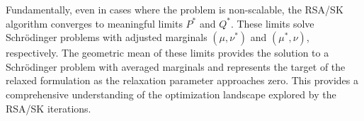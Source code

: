\documentclass{article}
\begin{document}
Fundamentally, even in cases where the problem is non-scalable, the RSA/SK algorithm converges to meaningful limits $P^*$ and $Q^*$. These limits solve Schrödinger problems with adjusted marginals $(\mu, \nu^*)$ and $(\mu^*, \nu)$, respectively. The geometric mean of these limits provides the solution to a Schrödinger problem with averaged marginals and represents the target of the relaxed formulation as the relaxation parameter approaches zero. This provides a comprehensive understanding of the optimization landscape explored by the RSA/SK iterations.
\end{document}
